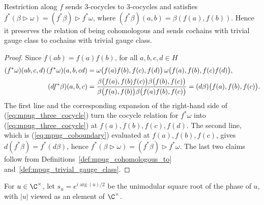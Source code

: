 \begin{lemma}
    \label{thm:mpug_cochain_restriction}
    \leanok
    Restriction along $f$ sends $3$-cocycles to $3$-cocycles and satisfies
    $f^*(\beta\mathbin{\triangleright}\omega)
        =(f^*\beta)\mathbin{\triangleright}f^*\omega$, where
    $(f^*\beta)(a,b)=\beta(f(a),f(b))$. Hence it preserves the relation of
    being cohomologous and sends cochains with trivial gauge class to
    cochains with trivial gauge class.
\end{lemma}
\begin{proof}\leanok
    Since $f(ab)=f(a)f(b)$, for all $a,b,c,d\in H$
    \begin{align}
        (f^*\omega)(ab,c,d)\,(f^*\omega)(a,b,cd)
         & =\omega\bigl(f(a)f(b),f(c),f(d)\bigr)\,
        \omega\bigl(f(a),f(b),f(c)f(d)\bigr),
        \notag                                                             \\
        (d f^*\beta)(a,b,c)
         & =\frac{\beta\bigl(f(a),f(b)f(c)\bigr)\beta\bigl(f(b),f(c)\bigr)}
            {\beta\bigl(f(a),f(b)\bigr)\beta\bigl(f(a)f(b),f(c)\bigr)}
        =(d\beta)\bigl(f(a),f(b),f(c)\bigr).
        \notag
    \end{align}
    The first line and the corresponding expansion of the right-hand side
    of (\ref{eq:mpug_three_cocycle}) turn the cocycle relation for $f^*\omega$
    into (\ref{eq:mpug_three_cocycle}) at $f(a),f(b),f(c),f(d)$. The second
    line, which is (\ref{eq:mpug_coboundary}) evaluated at $f(a),f(b),f(c)$,
    gives $d(f^*\beta)=f^*(d\beta)$, hence
    $f^*(\beta\mathbin{\triangleright}\omega)
        =(f^*\beta)\mathbin{\triangleright}f^*\omega$. The last two claims
    follow from Definitions~\ref{def:mpug_cohomologous_to}
    and~\ref{def:mpug_trivial_gauge_class}.
\end{proof}

\begin{definition}
    \label{def:mpug_phase_root}
    \leanok
    For $u\in\C^\times$, let $s_u=e^{i\arg(u)/2}$ be the unimodular square root
    of the phase of $u$, with $|u|$ viewed as an element of $\C^\times$.
\end{definition}

